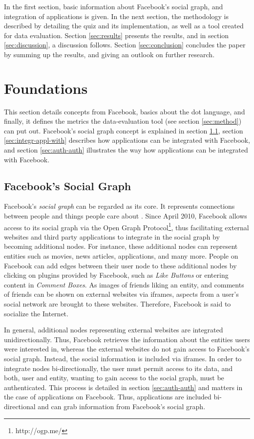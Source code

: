 \documentclass[preprint,12pt]{elsarticle}
\begin{document}
In the first section, basic information about Facebook's social graph,
and integration of applications is
given. In the next section, the methodology is described by detailing
the quiz and its implementation, as well as a tool created for data
evaluation. Section 
\ref{sec:results} presents the results, and in section
\ref{sec:discussion}, a discussion follows. Section
\ref{sec:conclusion} concludes the paper by summing up the results,
and giving an outlook on further research.


\section{Foundations}
\label{sec:background}
This section details concepts from Facebook, basics about the
\ac{dot} language, and finally, it defines the metrics the
data-evaluation tool (see section \ref{sec:method}) can put out. Facebook's
social graph concept is explained in 
section \ref{sec:social-graph}, section \ref{sec:integr-appl-with}
describes how applications can be integrated with Facebook, and
section \ref{sec:auth-auth} illustrates the way how applications can be
integrated with Facebook.

\subsection{Facebook's Social Graph}
\label{sec:social-graph}
Facebook's \textit{social graph} can be regarded as its core. It
represents connections between people and things people care about 
\cite{facebookDev}. Since April 2010, Facebook allows access to its
social graph via the Open Graph Protocol\footnote{http://ogp.me/}, thus facilitating
external websites and third party applications to integrate in the social graph by becoming
additional nodes\cite{facebookDev2}. For instance, these additional
nodes can represent entities such as movies, news articles, 
applications, and many more. People on Facebook can add edges
between their user node to these additional nodes by clicking on plugins
provided by Facebook, such as \textit{Like Buttons} or entering content in \textit{Comment
  Boxes}.  \cite{facebookDev2} As images of friends liking an
entity, and comments of friends can be shown on external websites via
iframes, aspects from a user's social network are brought to these
websites. Therefore, Facebook is said to socialize the Internet.

In general, additional nodes representing external websites are integrated
unidirectionally. Thus, Facebook retrieves the information about the
entities users were interested in, whereas the external websites do not
gain access to Facebook's social graph. Instead, the social
information is included via iframes.
In order to integrate nodes bi-directionally, the user must permit 
access to its data, and both,  user and entity, wanting to gain access
to the social graph, must be authenticated. This process is detailed in
section \ref{sec:auth-auth} and matters in the case of applications on
Facebook. Thus, applications are included bi-directional and can grab
information from Facebook's social graph.
\end{document}
